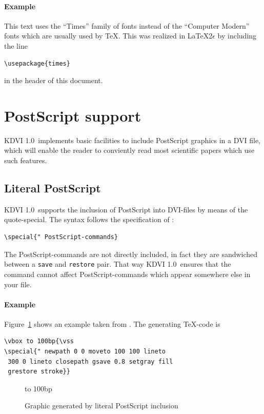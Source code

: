 \documentclass{article}
\newcommand{\KDVI}{{\sf KDVI 1.0}}
\begin{document}
\paragraph*{Example}

This text uses the ``Times'' family of fonts instead of the ``Computer
Modern'' fonts which are usually used by \TeX. This was realized in
\LaTeX 2$\epsilon$ by including the line
\begin{verbatim}
\usepackage{times} 
\end{verbatim}
in the header of this document.


\section{PostScript support}

\KDVI\ implements basic facilities to include PostScript graphics in a
DVI file, which will enable the reader to conviently read most
scientific papers which use such features. 

\subsection{Literal PostScript}

\KDVI\ supports the inclusion of PostScript into DVI-files by means of
the quote-special. The syntax follows the specification of
\cite{dvips}:
\begin{verbatim}
\special{" PostScript-commands}
\end{verbatim}
The PostScript-commands are not directly included, in fact they are
sandwiched between a {\tt save} and {\tt restore} pair. That way
\KDVI\ ensures that the command cannot affect PostScript-commands
which appear somewhere else in your file.

\paragraph*{Example}

Figure~\ref{quote-special} shows an example taken from \cite{dvips}.
The generating \TeX -code is
\begin{verbatim}
\vbox to 100bp{\vss
\special{" newpath 0 0 moveto 100 100 lineto
 300 0 lineto closepath gsave 0.8 setgray fill 
 grestore stroke}}
\end{verbatim}

\begin{figure}
\vbox to 100bp{\vss
{}}
\caption{Graphic generated by literal PostScript inclusion\label{quote-special}}
\end{figure}
\end{document}
